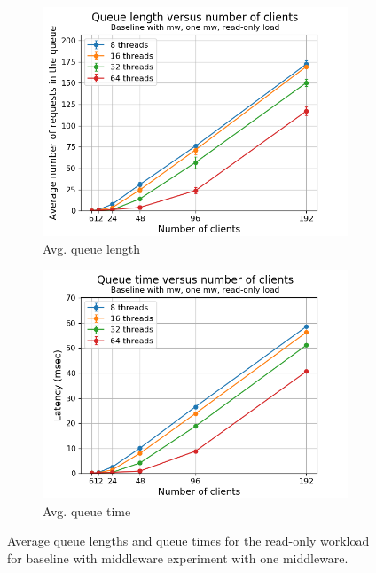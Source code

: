 \documentclass[11pt,a4paper]{article}
\begin{document}
\begin{figure}[h!]
\centering
\begin{subfigure}{.5\textwidth}
  \centering
  \includegraphics[width=1.0\linewidth,trim={5px 0px 20px 0px},clip]{img/plot/mwb1-ro-qlen_mw.png}
  \caption{Avg. queue length}
  \label{fig:mwb1-ro-qlen_mw}
\end{subfigure}%
\begin{subfigure}{.5\textwidth}
  \centering
  \includegraphics[width=1.0\linewidth,trim={5px 0px 20px 0px},clip]{img/plot/mwb1-ro-qtime_mw.png}
  \caption{Avg. queue time}
  \label{fig:mwb1-ro-qtime_mw}
\end{subfigure}
\caption{Average queue lengths and queue times for the read-only workload for baseline with middleware experiment with one middleware.}
\label{fig:mwb1-ro-qstats}
\end{figure}
\end{document}
